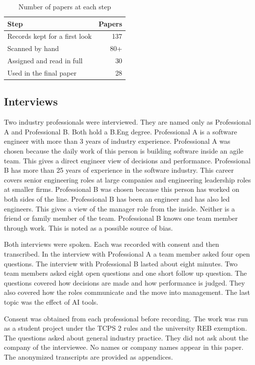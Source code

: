 \documentclass[conference]{IEEEtran}
\begin{document}
\begin{table}[!t]
\caption{Number of papers at each step}
\centering\footnotesize
\begin{tabular}{lr}
\hline
Step & Papers \\ \hline
Records kept for a first look & 137 \\
Scanned by hand & 80+ \\
Assigned and read in full & 30 \\
Used in the final paper & 28 \\
\hline
\end{tabular}
\end{table}

\subsection{Interviews}

Two industry professionals were interviewed. They are named only as Professional A and Professional B. Both hold a B.Eng degree. Professional A is a software engineer with more than 3 years of industry experience. Professional A was chosen because the daily work of this person is building software inside an agile team. This gives a direct engineer view of decisions and performance. Professional B has more than 25 years of experience in the software industry. This career covers senior engineering roles at large companies and engineering leadership roles at smaller firms. Professional B was chosen because this person has worked on both sides of the line. Professional B has been an engineer and has also led engineers. This gives a view of the manager role from the inside. Neither is a friend or family member of the team. Professional B knows one team member through work. This is noted as a possible source of bias.

Both interviews were spoken. Each was recorded with consent and then transcribed. In the interview with Professional A a team member asked four open questions. The interview with Professional B lasted about eight minutes. Two team members asked eight open questions and one short follow up question. The questions covered how decisions are made and how performance is judged. They also covered how the roles communicate and the move into management. The last topic was the effect of AI tools.

Consent was obtained from each professional before recording. The work was run as a student project under the TCPS 2 rules and the university REB exemption. The questions asked about general industry practice. They did not ask about the company of the interviewee. No names or company names appear in this paper. The anonymized transcripts are provided as appendices.
\end{document}
